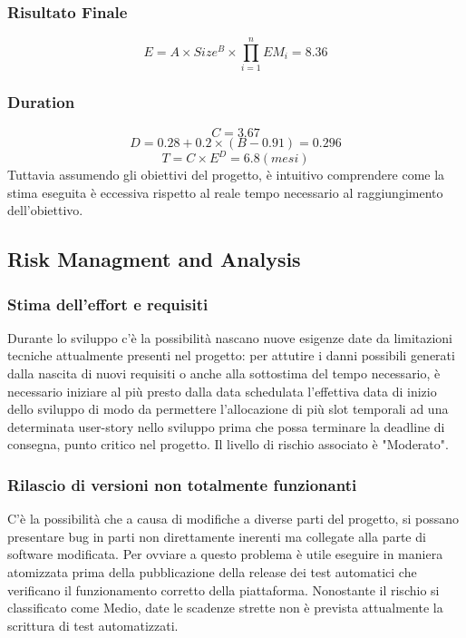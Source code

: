 \documentclass[11pt]{article}
\begin{document}
\subsubsection{Risultato Finale}
   \[ E = A \times Size^B \times \prod_{i=1}^{n} EM_i = 8.36 \]
\subsubsection{Duration}
   \[ C = 3.67 \]
   \[ D = 0.28 + 0.2 \times (B - 0.91) = 0.296 \]
   \[ T = C \times E^D = 6.8 (mesi) \]
   Tuttavia assumendo gli obiettivi del progetto, è intuitivo comprendere come la stima eseguita è eccessiva rispetto al reale tempo necessario al raggiungimento dell'obiettivo.
\subsection{Risk Managment and Analysis}
\subsubsection{Stima dell'effort e requisiti}
Durante lo sviluppo c'è la possibilità nascano nuove esigenze date da limitazioni tecniche attualmente presenti nel progetto: per attutire i danni possibili generati dalla nascita di nuovi requisiti o anche alla sottostima del tempo necessario, è necessario iniziare al più presto dalla data schedulata l'effettiva data di inizio dello sviluppo di modo da permettere l'allocazione di più slot temporali ad una determinata user-story nello sviluppo prima che possa terminare la deadline di consegna, punto critico nel progetto. Il livello di rischio associato è "Moderato".
\subsubsection{Rilascio di versioni non totalmente funzionanti}
C'è la possibilità che a causa di modifiche a diverse parti del progetto, si possano presentare bug in parti non direttamente inerenti ma collegate alla parte di software modificata. Per ovviare a questo problema è utile eseguire in maniera atomizzata prima della pubblicazione della release dei test automatici che verificano il funzionamento corretto della piattaforma. Nonostante il rischio si classificato come Medio, date le scadenze strette non è prevista attualmente la scrittura di test automatizzati.
\end{document}
